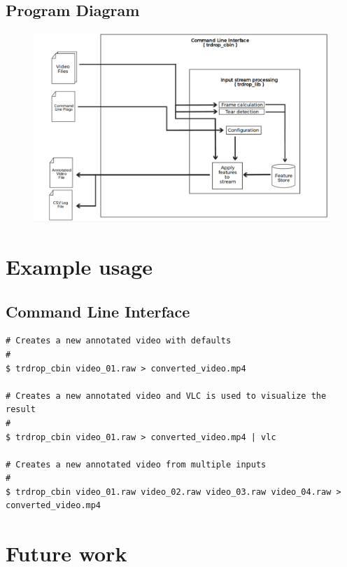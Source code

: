 \documentclass[titlepage]{article}
\begin{document}
\subsection{Program Diagram}

\begin{figure}[H]
\hspace{-30mm}
\includegraphics[width=500pt,left]{../../images/trdrop_diagram.eps}
\end{figure}

\section{Example usage}

\subsection{Command Line Interface}

\begin{verbatim}
# Creates a new annotated video with defaults
#
$ trdrop_cbin video_01.raw > converted_video.mp4

# Creates a new annotated video and VLC is used to visualize the result
#
$ trdrop_cbin video_01.raw > converted_video.mp4 | vlc

# Creates a new annotated video from multiple inputs
#
$ trdrop_cbin video_01.raw video_02.raw video_03.raw video_04.raw > converted_video.mp4
\end{verbatim}


\section{Future work}
\end{document}
